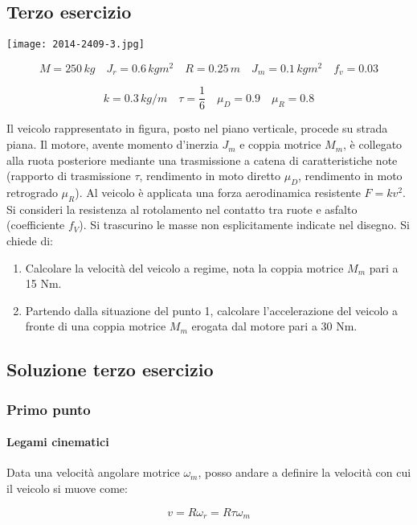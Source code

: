 \documentclass[main.tex]{subfiles}
\begin{document}
\subsection{Terzo esercizio}

\texttt{[image: 2014-2409-3.jpg]}

\[
  M = 250\,kg\quad
  J_r = 0.6\,kgm^2\quad
  R = 0.25\,m\quad
  J_m = 0.1\,kgm^2\quad
  f_v = 0.03
\]

\[
  k = 0.3\,kg/m\quad
  \tau = \dfrac{1}{6}\quad
  \mu_D = 0.9 \quad
  \mu_R = 0.8
\]

Il veicolo rappresentato in figura, posto nel piano verticale, procede su strada piana. Il motore, avente momento d'inerzia $J_m$ e coppia motrice $M_m$, è collegato alla ruota posteriore mediante una trasmissione a catena di caratteristiche note (rapporto di trasmissione $\tau$, rendimento in moto diretto $\mu_D$, rendimento in moto retrogrado $\mu_R$). Al veicolo è applicata una forza aerodinamica resistente $F = kv^2$. Si consideri la resistenza al rotolamento nel contatto tra ruote e asfalto (coefficiente $f_V$). Si trascurino le masse non esplicitamente indicate nel disegno.
Si chiede di:

\begin{enumerate}
\item Calcolare la velocità del veicolo a regime, nota la coppia motrice $M_m$ pari a 15 Nm.
\item Partendo dalla situazione del punto 1, calcolare l’accelerazione del veicolo a fronte di una coppia motrice $M_m$ erogata dal motore pari a 30 Nm.
\end{enumerate}

\clearpage

\subsection{Soluzione terzo esercizio}

\subsubsection{Primo punto}

\paragraph{Legami cinematici} Data una velocità angolare motrice $\omega_m$, posso andare a definire la velocità con cui il veicolo si muove come:

\[
  v = R\omega_r = R\tau\omega_m
\]
\end{document}
